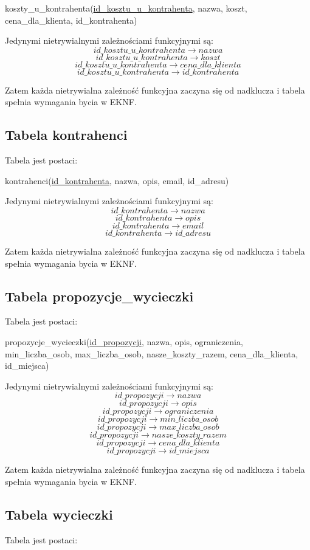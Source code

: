\documentclass[a4paper,12pt]{mwart}
\begin{document}
koszty\_u\_kontrahenta(\underline{id\_kosztu\_u\_kontrahenta}, nazwa, koszt, cena\_dla\_klienta, id\_kontrahenta)

\noindent Jedynymi nietrywialnymi zależnościami funkcyjnymi są:
$$   id\_kosztu\_u\_kontrahenta\rightarrow nazwa $$
$$   id\_kosztu\_u\_kontrahenta\rightarrow koszt $$
$$   id\_kosztu\_u\_kontrahenta\rightarrow cena\_dla\_klienta $$
$$   id\_kosztu\_u\_kontrahenta\rightarrow id\_kontrahenta $$


Zatem każda nietrywialna zależność funkcyjna zaczyna się od nadklucza i tabela  spełnia wymagania bycia w EKNF.


\subsection{Tabela kontrahenci}
Tabela jest postaci:

kontrahenci(\underline{id\_kontrahenta}, nazwa, opis, email, id\_adresu)

\noindent Jedynymi nietrywialnymi zależnościami funkcyjnymi są:
$$   id\_kontrahenta  \rightarrow nazwa $$
$$   id\_kontrahenta  \rightarrow opis $$
$$   id\_kontrahenta \rightarrow email $$
$$   id\_kontrahenta \rightarrow id\_adresu $$


Zatem każda nietrywialna zależność funkcyjna zaczyna się od nadklucza i tabela  spełnia wymagania bycia w EKNF.


\subsection{Tabela propozycje\_wycieczki}
Tabela jest postaci:

propozycje\_wycieczki(\underline{id\_propozycji}, nazwa, opis, ograniczenia, min\_liczba\_osob, max\_liczba\_osob, nasze\_koszty\_razem, cena\_dla\_klienta, id\_miejsca)

\noindent Jedynymi nietrywialnymi zależnościami funkcyjnymi są:
$$   id\_propozycji  \rightarrow nazwa $$
$$   id\_propozycji\rightarrow opis $$
$$   id\_propozycji\rightarrow ograniczenia $$
$$   id\_propozycji\rightarrow min\_liczba\_osob $$
$$   id\_propozycji\rightarrow max\_liczba\_osob $$
$$   id\_propozycji\rightarrow nasze\_koszty\_razem $$
$$   id\_propozycji\rightarrow cena\_dla\_klienta $$
$$   id\_propozycji\rightarrow id\_miejsca $$


Zatem każda nietrywialna zależność funkcyjna zaczyna się od nadklucza i tabela  spełnia wymagania bycia w EKNF.

\subsection{Tabela wycieczki}
Tabela jest postaci:
\end{document}
